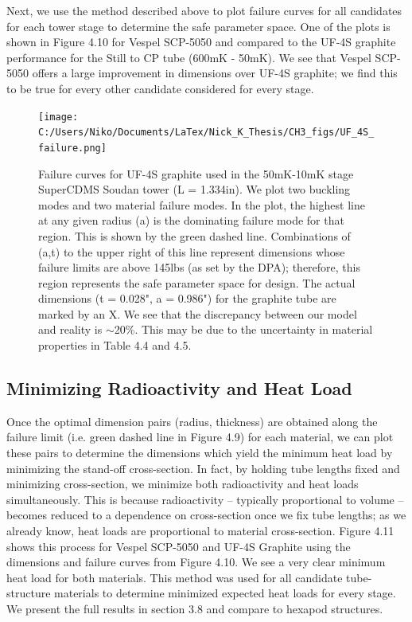 \documentclass{report}
\begin{document}
Next, we use the method described above to plot failure curves for all candidates for each tower stage to determine the safe parameter space. One of the plots is shown in Figure 4.10 for Vespel SCP-5050 and compared to the UF-4S graphite performance for the Still to CP tube (600mK - 50mK). We see that Vespel SCP-5050 offers a large improvement in dimensions over UF-4S graphite; we find this to be true for every other candidate considered for every stage.

\begin{figure}[ht]
\centering
\texttt{[image: C:/Users/Niko/Documents/LaTex/Nick\_K\_Thesis/CH3\_figs/UF\_4S\_failure.png]}
\caption{Failure curves for UF-4S graphite used in the 50mK-10mK stage SuperCDMS Soudan tower (L = 1.334in). We plot two buckling modes and two material failure modes. In the plot, the highest line at any given radius (a) is the dominating failure mode for that region. This is shown by the green dashed line. Combinations of (a,t) to the upper right of this line represent dimensions whose failure limits are above 145lbs (as set by the DPA); therefore, this region represents the safe parameter space for design. The actual dimensions (t = 0.028", a = 0.986") for the graphite tube are marked by an X. We see that the discrepancy between our model and reality is $\sim$20\%. This may be due to the uncertainty in material properties in Table 4.4 and 4.5.}
\end{figure}

\subsection{Minimizing Radioactivity and Heat Load}


Once the optimal dimension pairs (radius, thickness) are obtained along the failure limit (i.e. green dashed line in Figure 4.9) for each material, we can plot these pairs to determine the dimensions which yield the minimum heat load by minimizing the stand-off cross-section. In fact, by holding tube lengths fixed and minimizing cross-section, we minimize both radioactivity and heat loads simultaneously. This is because radioactivity -- typically proportional to volume -- becomes reduced to a dependence on cross-section once we fix tube lengths; as we already know, heat loads are proportional to material cross-section. Figure 4.11 shows this process for Vespel SCP-5050 and UF-4S Graphite using the dimensions and failure curves from Figure 4.10. We see a very clear minimum heat load for both materials. This method was used for all candidate tube-structure materials to determine minimized expected heat loads for every stage. We present the full results in section 3.8 and compare to hexapod structures.
\end{document}
